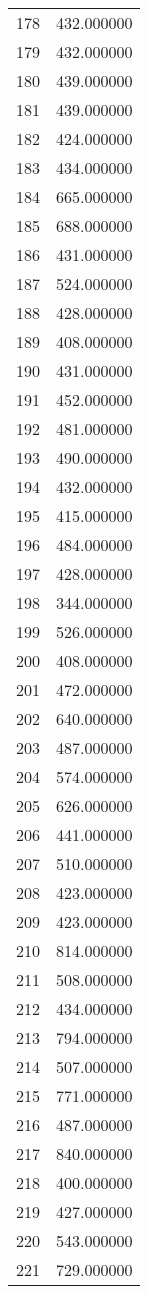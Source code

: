 \documentclass[12pt]{article}
\begin{document}
\begin{longtable}{@{}cc@{}}
178 & 432.000000 \\
179 & 432.000000 \\
180 & 439.000000 \\
181 & 439.000000 \\
182 & 424.000000 \\
183 & 434.000000 \\
184 & 665.000000 \\
185 & 688.000000 \\
186 & 431.000000 \\
187 & 524.000000 \\
188 & 428.000000 \\
189 & 408.000000 \\
190 & 431.000000 \\
191 & 452.000000 \\
192 & 481.000000 \\
193 & 490.000000 \\
194 & 432.000000 \\
195 & 415.000000 \\
196 & 484.000000 \\
197 & 428.000000 \\
198 & 344.000000 \\
199 & 526.000000 \\
200 & 408.000000 \\
201 & 472.000000 \\
202 & 640.000000 \\
203 & 487.000000 \\
204 & 574.000000 \\
205 & 626.000000 \\
206 & 441.000000 \\
207 & 510.000000 \\
208 & 423.000000 \\
209 & 423.000000 \\
210 & 814.000000 \\
211 & 508.000000 \\
212 & 434.000000 \\
213 & 794.000000 \\
214 & 507.000000 \\
215 & 771.000000 \\
216 & 487.000000 \\
217 & 840.000000 \\
218 & 400.000000 \\
219 & 427.000000 \\
220 & 543.000000 \\
221 & 729.000000 \\

\end{longtable}
\end{document}
